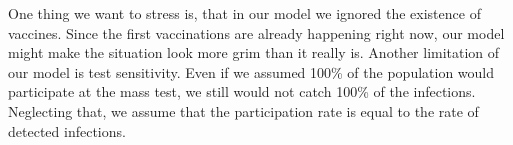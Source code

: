 \documentclass
[
    report,
    11pt,
    bibliography = totoc,
    listof = totoc,
    headinclude = true,
]
{scrreport}
\begin{document}
One thing we want to stress is, that in our model we ignored the existence of vaccines. Since the first vaccinations are already happening right now, our model might make the situation look more grim than it really is.
Another limitation of our model is test sensitivity.
Even if we assumed 100\% of the population would participate at the mass test,
we still would not catch 100\% of the infections.
Neglecting that, we assume that the participation rate is equal to the rate
of detected infections.

\begingroup
\renewcommand{\cleardoublepage}{}
\renewcommand{\clearpage}{}
\printbibliography
\endgroup
\end{document}
